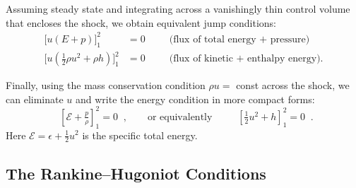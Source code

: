 Assuming steady state and integrating across a vanishingly thin control volume that encloses the shock, we obtain equivalent jump conditions:
\begin{equation}
    \begin{aligned}
        \big[u(E+p)\big]_1^2 &= 0 
        &&\;\;\; \text{(flux of total energy + pressure)} \\[6pt]
        \big[u(\tfrac{1}{2}\rho u^2 + \rho h)\big]_1^2 &= 0
        &&\;\;\; \text{(flux of kinetic + enthalpy energy)} .
    \end{aligned}
\end{equation}

\noindent
Finally, using the mass conservation condition $\rho u =$ const across the shock, we can eliminate $u$ and write the energy condition in more compact forms:
\begin{equation}
    \boxed{ \;\;\left[ \mathcal{E} + \tfrac{p}{\rho} \right]_1^2 = 0 \;\;} ,
    \qquad\text{or equivalently}\qquad
    \boxed{ \;\;\left[ \tfrac{1}{2}u^2 + h \right]_1^2 = 0 \;\;} .
\end{equation}
Here $\mathcal{E} = \epsilon + \tfrac{1}{2}u^2$ is the specific total energy.

\subsection{The Rankine--Hugoniot Conditions}

